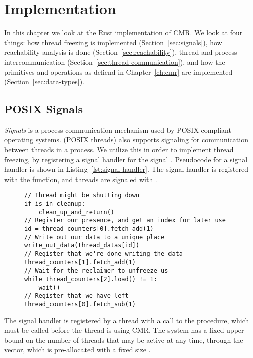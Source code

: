 \chapter{Implementation}

In this chapter we look at the Rust implementation of CMR\@.  We look at four things: how thread
freezing is implemented (Section~\ref{sec:signals}), how reachability analysis is done
(Section~\ref{sec:reachability}), thread and process intercommunication
(Section~\ref{sec:thread-communication}), and how the primitives and operations as defiend in
Chapter~\ref{ch:cmr} are implemented (Section~\ref{sec:data-types}).


\section{POSIX Signals\label{sec:signals}}

\emph{Signals} is a process communication mechanism used by POSIX compliant operating systems.
 (POSIX threads) also supports signaling for communication between threads in a
process. We utilize this in order to implement thread freezing, by registering a signal handler for
the signal . Pseudocode for a signal handler is shown in
Listing~\ref{lst:signal-handler}. The signal handler is registered with the 
function, and threads are signaled with .

\begin{figure}[ht]
  \begin{lstlisting}[caption=Pseudocode for the signal handler used by CMR,label=lst:signal-handler]
// Thread might be shutting down
if is_in_cleanup:
    clean_up_and_return()
// Register our presence, and get an index for later use
id = thread_counters[0].fetch_add(1)
// Write out our data to a unique place
write_out_data(thread_datas[id])
// Register that we're done writing the data
thread_counters[1].fetch_add(1)
// Wait for the reclaimer to unfreeze us
while thread_counters[2].load() != 1:
    wait()
// Register that we have left
thread_counters[0].fetch_sub(1)
  \end{lstlisting}
\end{figure}

The signal handler is registered by a thread with a call to the  procedure,
which must be called before the thread is using CMR\@. 
The system has a fixed upper bound on the number of threads that may be active at any time, through
the  vector, which is pre-allocated with a fixed size .

